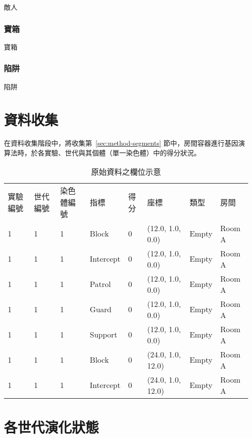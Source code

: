 敵人

\subsubsection{寶箱}
\label{sssec:experiment-gameobjects-treasure}

寶箱

\subsubsection{陷阱}
\label{sssec:experiment-gameobjects-trap}

陷阱

\section{資料收集}
\label{sec:experiment-datacollection}

在資料收集階段中，將收集第~\ref{sec:method-segments} 節中，房間容器進行基因演算法時，於各實驗、世代與其個體（單一染色體）中的得分狀況。

\begin{table}[ht]
  \centering
  \caption{原始資料之欄位示意}
  \label{tbl:structure-of-rawdata}
  \bigskip
  \begin{tabular}{| l | l | l | l | l | l | l | l |}
    \hline
    實驗編號 & 世代編號 & 染色體編號 & 指標 & 得分 & 座標 & 類型 & 房間 \\
    1 & 1 & 1 & Block     & 0 & (12.0, 1.0, 0.0)  & Empty & Room A \\
    1 & 1 & 1 & Intercept & 0 & (12.0, 1.0, 0.0)  & Empty & Room A \\
    1 & 1 & 1 & Patrol    & 0 & (12.0, 1.0, 0.0)  & Empty & Room A \\
    1 & 1 & 1 & Guard     & 0 & (12.0, 1.0, 0.0)  & Empty & Room A \\
    1 & 1 & 1 & Support   & 0 & (12.0, 1.0, 0.0)  & Empty & Room A \\
    1 & 1 & 1 & Block     & 0 & (24.0, 1.0, 12.0) & Empty & Room A \\
    1 & 1 & 1 & Intercept & 0 & (24.0, 1.0, 12.0) & Empty & Room A \\
    \hline
  \end{tabular}
\end{table}

\section{各世代演化狀態}
\label{sec:experiment-evolutions}

